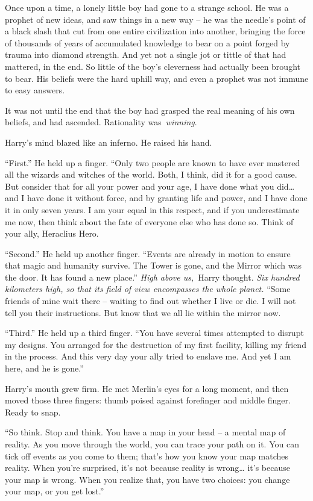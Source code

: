 Once upon a time, a lonely little boy had gone to a strange school. He
was a prophet of new ideas, and saw things in a new way -- he was the
needle's point of a black slash that cut from one entire civilization
into another, bringing the force of thousands of years of accumulated
knowledge to bear on a point forged by trauma into diamond strength. And
yet not a single jot or tittle of that had mattered, in the end. So
little of the boy's cleverness had actually been brought to bear. His
beliefs were the hard uphill way, and even a prophet was not immune to
easy answers.

It was not until the end that the boy had grasped the real meaning of
his own beliefs, and had ascended. Rationality was~\emph{winning}.

Harry's mind blazed like an inferno. He raised his hand.

``First.'' He held up a finger. ``Only two people are known to have ever
mastered all the wizards and witches of the world. Both, I think, did it
for a good cause. But consider that for all your power and your age, I
have done what you did\ldots{} and I have done it without force, and by
granting life and power, and I have done it in only seven years. I am
your equal in this respect, and if you underestimate me now, then think
about the fate of everyone else who has done so. Think of your ally,
Heraclius Hero.

``Second.'' He held up another finger. ``Events are already in motion to
ensure that magic and humanity survive. The Tower is gone, and the
Mirror which was the door. It has found a new place.'' \emph{High above
us,}~Harry thought. \emph{Six hundred kilometers high, so that its field
of view encompasses the whole planet.} ``Some friends of mine wait there
-- waiting to find out whether I live or die. I will not tell you their
instructions. But know that we all lie within the mirror now.

``Third.'' He held up a third finger. ``You have several times attempted
to disrupt my designs. You arranged for the destruction of my first
facility, killing my friend in the process. And this very day your ally
tried to enslave me. And yet I am here, and he is gone.''

Harry's mouth grew firm. He met Merlin's eyes for a long moment, and
then moved those three fingers: thumb poised against forefinger and
middle finger. Ready to snap.

``So think. Stop and think. You have a map in your head -- a mental map
of reality. As you move through the world, you can trace your path on
it. You can tick off events as you come to them; that's how you know
your map matches reality. When you're surprised, it's not because
reality is wrong\ldots{} it's because your map is wrong. When you
realize that, you have two choices: you change your map, or you get
lost.''

